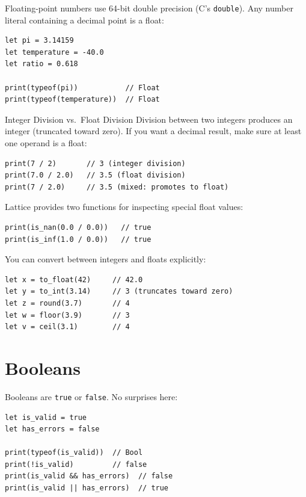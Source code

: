 Floating-point numbers use 64-bit double precision (C's \lstinline|double|).
Any number literal containing a decimal point is a float:

\begin{lstlisting}[language=Lattice, caption={Float basics}]
let pi = 3.14159
let temperature = -40.0
let ratio = 0.618

print(typeof(pi))           // Float
print(typeof(temperature))  // Float
\end{lstlisting}

\begin{warnbox}{Integer Division vs.\ Float Division}
Division between two integers produces an integer (truncated toward zero).
If you want a decimal result, make sure at least one operand is a float:
\begin{lstlisting}[language=Lattice, numbers=none]
print(7 / 2)       // 3 (integer division)
print(7.0 / 2.0)   // 3.5 (float division)
print(7 / 2.0)     // 3.5 (mixed: promotes to float)
\end{lstlisting}
\end{warnbox}

Lattice provides two functions for inspecting special float values:

\begin{lstlisting}[language=Lattice, caption={Special float values}]
print(is_nan(0.0 / 0.0))   // true
print(is_inf(1.0 / 0.0))   // true
\end{lstlisting}

You can convert between integers and floats explicitly:

\begin{lstlisting}[language=Lattice, caption={Numeric conversions}]
let x = to_float(42)     // 42.0
let y = to_int(3.14)     // 3 (truncates toward zero)
let z = round(3.7)       // 4
let w = floor(3.9)       // 3
let v = ceil(3.1)        // 4
\end{lstlisting}

\section{Booleans}\label{sec:booleans}

Booleans are \lstinline|true| or \lstinline|false|.
No surprises here:

\begin{lstlisting}[language=Lattice, caption={Boolean basics}]
let is_valid = true
let has_errors = false

print(typeof(is_valid))  // Bool
print(!is_valid)         // false
print(is_valid && has_errors)  // false
print(is_valid || has_errors)  // true
\end{lstlisting}

